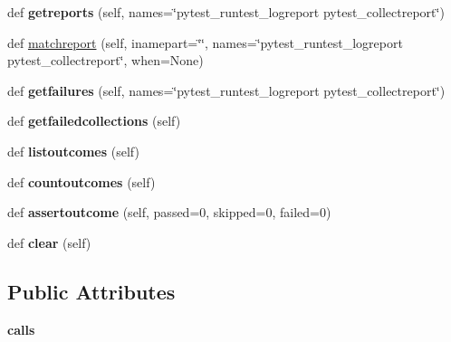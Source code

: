 \begin{DoxyCompactItemize}
def {\bfseries getreports} (self, names=\char`\"{}pytest\+\_\+runtest\+\_\+logreport pytest\+\_\+collectreport\char`\"{})
\item 
def \hyperlink{class__pytest_1_1pytester_1_1_hook_recorder_ac2cd71da5aceb43cf6d57b14429e92a9}{matchreport} (self, inamepart=\char`\"{}\char`\"{}, names=\char`\"{}pytest\+\_\+runtest\+\_\+logreport pytest\+\_\+collectreport\char`\"{}, when=None)
\item 
\mbox{\label{class__pytest_1_1pytester_1_1_hook_recorder_aaf87db60783e68043be5a1712f75ecd5}} 
def {\bfseries getfailures} (self, names=\char`\"{}pytest\+\_\+runtest\+\_\+logreport pytest\+\_\+collectreport\char`\"{})
\item 
\mbox{\label{class__pytest_1_1pytester_1_1_hook_recorder_a6cac0d813de3d017d25d0ca8767a3ffd}} 
def {\bfseries getfailedcollections} (self)
\item 
\mbox{\label{class__pytest_1_1pytester_1_1_hook_recorder_a6d80d77df1d65143a5280171ccd5abf7}} 
def {\bfseries listoutcomes} (self)
\item 
\mbox{\label{class__pytest_1_1pytester_1_1_hook_recorder_aebc69324fab4490998b8bc40d568c1e9}} 
def {\bfseries countoutcomes} (self)
\item 
\mbox{\label{class__pytest_1_1pytester_1_1_hook_recorder_adfbd61d73e4f358c38f24f7a5a7c866b}} 
def {\bfseries assertoutcome} (self, passed=0, skipped=0, failed=0)
\item 
\mbox{\label{class__pytest_1_1pytester_1_1_hook_recorder_a4205cb0c6397d8919c00a26c0fa71892}} 
def {\bfseries clear} (self)
\end{DoxyCompactItemize}
\subsection*{Public Attributes}
\begin{DoxyCompactItemize}
\item 
\mbox{\label{class__pytest_1_1pytester_1_1_hook_recorder_a5a120ecf53edbc3ffe607bb4bc6238d4}} 
{\bfseries calls}
\end{DoxyCompactItemize}


